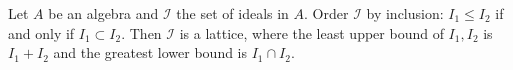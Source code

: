 Let $A$ be an algebra and $\mathcal{I}$ the set of ideals in $A$. Order $\mathcal{I}$ by inclusion: $I_1 \leq I_2$ if and only if $I_1 \subset I_2$. Then $\mathcal{I}$ is a lattice, where the least upper bound of $I_1, I_2$ is $I_1 + I_2$ and the greatest lower bound is $I_1 \cap I_2$.
